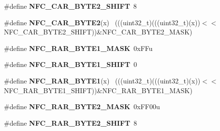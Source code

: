 \begin{DoxyCompactItemize}
\item 
\hypertarget{group___n_f_c___register___masks_ga549a8f03b2504d5e99b8112d79886d48}{}\#define {\bfseries N\+F\+C\+\_\+\+C\+A\+R\+\_\+\+B\+Y\+T\+E2\+\_\+\+S\+H\+I\+F\+T}~8\label{group___n_f_c___register___masks_ga549a8f03b2504d5e99b8112d79886d48}

\item 
\hypertarget{group___n_f_c___register___masks_ga49954b73bd2a13734b82e9c1210662d3}{}\#define {\bfseries N\+F\+C\+\_\+\+C\+A\+R\+\_\+\+B\+Y\+T\+E2}(x)                                              ~(((uint32\+\_\+t)(((uint32\+\_\+t)(x))$<$$<$N\+F\+C\+\_\+\+C\+A\+R\+\_\+\+B\+Y\+T\+E2\+\_\+\+S\+H\+I\+F\+T))\&N\+F\+C\+\_\+\+C\+A\+R\+\_\+\+B\+Y\+T\+E2\+\_\+\+M\+A\+S\+K)\label{group___n_f_c___register___masks_ga49954b73bd2a13734b82e9c1210662d3}

\item 
\hypertarget{group___n_f_c___register___masks_ga26945b88dfc8b61ef8028780517ad36f}{}\#define {\bfseries N\+F\+C\+\_\+\+R\+A\+R\+\_\+\+B\+Y\+T\+E1\+\_\+\+M\+A\+S\+K}~0x\+F\+Fu\label{group___n_f_c___register___masks_ga26945b88dfc8b61ef8028780517ad36f}

\item 
\hypertarget{group___n_f_c___register___masks_ga14cb02186b0196a92012ecf5ffc1f27f}{}\#define {\bfseries N\+F\+C\+\_\+\+R\+A\+R\+\_\+\+B\+Y\+T\+E1\+\_\+\+S\+H\+I\+F\+T}~0\label{group___n_f_c___register___masks_ga14cb02186b0196a92012ecf5ffc1f27f}

\item 
\hypertarget{group___n_f_c___register___masks_ga15056289857c166c1ccc1eecc72032ce}{}\#define {\bfseries N\+F\+C\+\_\+\+R\+A\+R\+\_\+\+B\+Y\+T\+E1}(x)                                              ~(((uint32\+\_\+t)(((uint32\+\_\+t)(x))$<$$<$N\+F\+C\+\_\+\+R\+A\+R\+\_\+\+B\+Y\+T\+E1\+\_\+\+S\+H\+I\+F\+T))\&N\+F\+C\+\_\+\+R\+A\+R\+\_\+\+B\+Y\+T\+E1\+\_\+\+M\+A\+S\+K)\label{group___n_f_c___register___masks_ga15056289857c166c1ccc1eecc72032ce}

\item 
\hypertarget{group___n_f_c___register___masks_ga97600aa01b5bf647ed4cf28f2bab82d8}{}\#define {\bfseries N\+F\+C\+\_\+\+R\+A\+R\+\_\+\+B\+Y\+T\+E2\+\_\+\+M\+A\+S\+K}~0x\+F\+F00u\label{group___n_f_c___register___masks_ga97600aa01b5bf647ed4cf28f2bab82d8}

\item 
\hypertarget{group___n_f_c___register___masks_ga82e830935edd1d52a83a65531f555546}{}\#define {\bfseries N\+F\+C\+\_\+\+R\+A\+R\+\_\+\+B\+Y\+T\+E2\+\_\+\+S\+H\+I\+F\+T}~8\label{group___n_f_c___register___masks_ga82e830935edd1d52a83a65531f555546}


\end{DoxyCompactItemize}
